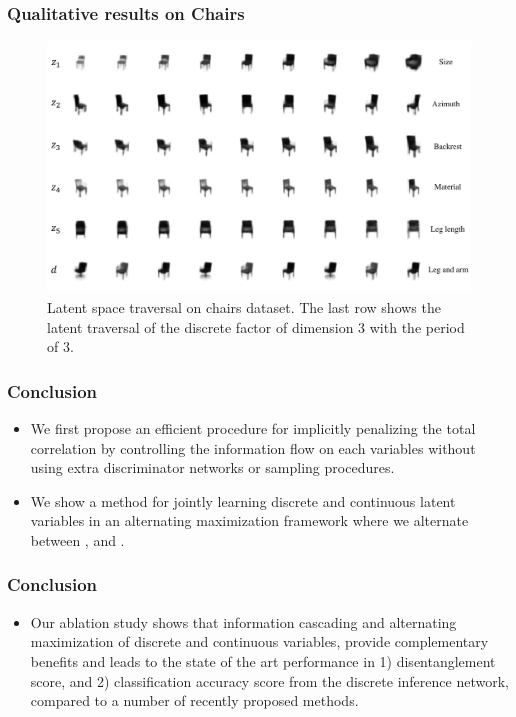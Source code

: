 \documentclass[10pt,mathserif]{beamer}
\begin{document}
\begin{frame}
\frametitle{Qualitative results on Chairs}
\begin{figure}[htbp]
\centering
\includegraphics[width=\linewidth]{chairs}
\caption{Latent space traversal on chairs dataset. The last row shows the latent traversal of the discrete factor of dimension 3 with the period of 3.}
\label{fig:chairs_latent_traversal}
\end{figure}
\end{frame}

\begin{frame}
\frametitle{Conclusion}
\begin{itemize}\itemsep=12pt
\item We first propose an efficient procedure for implicitly penalizing the total correlation by controlling the information flow on each variables without using extra discriminator networks or sampling procedures.
\item We show a method for jointly learning discrete and continuous latent variables in an alternating maximization framework where we alternate between {\color{blue}{finding the most likely discrete configurations based on the continuous latent variables}}, and {\color{blue}{updating the inference parameters based on the discrete variables}}. 
\end{itemize}
\end{frame}

\begin{frame}
\frametitle{Conclusion}
\begin{itemize}
\item Our ablation study shows that information cascading and alternating maximization of discrete and continuous variables, provide complementary benefits and leads to the state of the art performance in 1) disentanglement score, and 2) classification accuracy score from the discrete inference network, compared to a number of recently proposed methods.
\end{itemize}
\end{frame}
\end{document}
